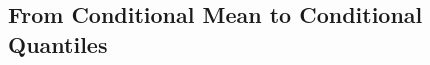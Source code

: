 \documentclass[pdflatex,sn-basic]{sn-jnl}%
\theoremstyle{thmstyleone}%
\theoremstyle{thmstyletwo}%
\theoremstyle{thmstylethree}%
\begin{document}

\subsection{From Conditional Mean to Conditional Quantiles}
\label{subsec:meantoquantiles}
\end{document}
